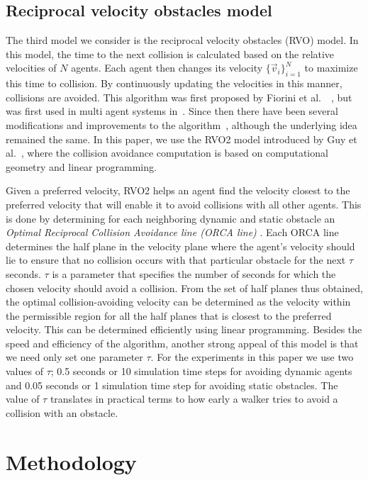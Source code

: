 \subsection{Reciprocal velocity obstacles model}
\label{RVOModel}

The third model we consider is the reciprocal velocity obstacles (RVO) model. In this model, the time to the next collision is calculated based on the relative velocities of $N$ agents. Each agent then changes its velocity $\{\vec{v}_i\}_{i=1}^N$ to maximize this time to collision. By continuously updating the velocities in this manner, collisions are avoided. This algorithm was first proposed by Fiorini et al.~~\cite{Fiorini:1993hi}, but was first used in multi agent systems in~\cite{vandenBerg:2008cq}. Since then there have been several modifications and improvements to the algorithm~\cite{Guy:2009gu,Guy:2010ko,Guy:2010te,Guy:2010uv}, although the underlying idea remained the same. In this paper, we use the RVO2 model introduced by Guy et al.~\cite{Guy:2010ko}, where the collision avoidance computation is based on computational geometry and linear programming.

Given a preferred velocity, RVO2 helps an agent find the velocity closest to the preferred velocity that will enable it to avoid collisions with all other agents. This is done by determining for each neighboring dynamic and static obstacle an \emph{Optimal Reciprocal Collision Avoidance line (ORCA line) }. Each ORCA line determines the half plane in the velocity plane where the agent's velocity should lie to ensure that no collision occurs with that particular obstacle for the next $\tau$ seconds. $\tau$ is a parameter that specifies the number of seconds for which the chosen velocity should avoid a collision. From the set of half planes thus obtained, the optimal collision-avoiding velocity can be determined as the velocity within the permissible region for all the half planes that is closest to the preferred velocity. This can be determined efficiently using linear programming. Besides the speed and efficiency of the algorithm, another strong appeal of this model is that we need only set one parameter $\tau$. For the experiments in this paper we use two values of $\tau$;  0.5 seconds or 10 simulation time steps for avoiding dynamic agents and  0.05 seconds or 1 simulation time step for avoiding static obstacles. The value of $\tau$ translates in practical terms to how early a walker tries to avoid a collision with an obstacle.


\section{Methodology}
\label{Methodology}

